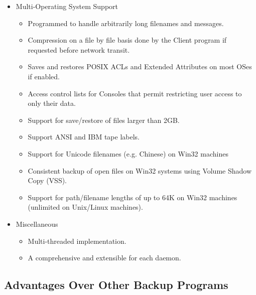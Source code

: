 \begin{itemize}
\item Multi-Operating System Support
   \begin{itemize}
   \item Programmed to handle arbitrarily long filenames and messages.
   \item Compression on a file by file basis done by the Client program  if
      requested before network transit.
    \item Saves and restores POSIX ACLs and Extended Attributes on most OSes if
      enabled.
   \item Access control lists for Consoles that permit restricting user access
      to only their data.
   \item Support for save/restore of files larger than 2GB.
   \item Support ANSI and IBM tape labels.
   \item Support for Unicode filenames (e.g. Chinese) on Win32 machines
   \item Consistent backup of open files on Win32 systems using Volume Shadow Copy (VSS).
   \item Support for path/filename lengths of up to 64K on Win32 machines
         (unlimited on Unix/Linux machines).
   \end{itemize}

\item Miscellaneous
   \begin{itemize}
   \item Multi-threaded implementation.
   \item A comprehensive and extensible
       for each daemon.
   \end{itemize}
\end{itemize}

\subsection{Advantages Over Other Backup Programs}

